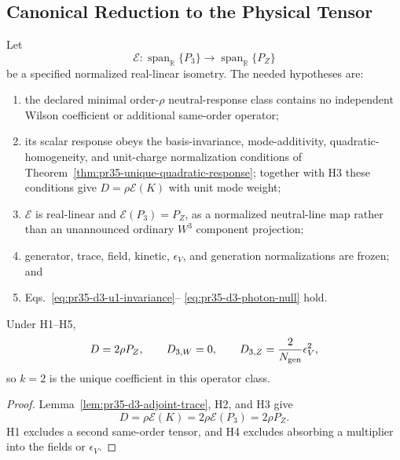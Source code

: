 \subsection{Canonical Reduction to the Physical Tensor}

Let
\begin{equation}
 \mathcal E:\operatorname{span}_{\mathbb R}\{P_3\}
 \longrightarrow\operatorname{span}_{\mathbb R}\{P_Z\}
\end{equation}
be a specified normalized real-linear isometry.  The needed hypotheses are: \begin{enumerate}[label=\textnormal{H\arabic*.},leftmargin=2.8em]  \item the declared minimal order-$\rho$ neutral-response class contains no  independent Wilson coefficient or additional same-order operator;
 \item its scalar response obeys the basis-invariance, mode-additivity,  quadratic-homogeneity, and unit-charge normalization conditions of  Theorem~\ref{thm:pr35-unique-quadratic-response}; together with H3 these  conditions give $D=\rho\mathcal E(K)$ with unit mode weight;  \item $\mathcal E$ is real-linear and $\mathcal E(P_3)=P_Z$, as a normalized  neutral-line map rather than an unannounced ordinary $W^3$ component  projection;
 \item generator, trace, field, kinetic, $\epsilon_V$, and generation
 normalizations are frozen; and
 \item Eqs.~\eqref{eq:pr35-d3-u1-invariance}--
 \eqref{eq:pr35-d3-photon-null} hold.
\end{enumerate}

\begin{theorem}
\label{thm:pr35-d3-conditional-uniqueness}
Under H1--H5,
\begin{equation}
 D=2\rho P_Z,\qquad
 D_{3,W}=0,\qquad
 D_{3,Z}=\frac{2}{N_{\rm gen}}\epsilon_V^2,
 \label{eq:pr35-d3-unique-canonical-result}
\end{equation}
so $k=2$ is the unique coefficient in this operator class.
\end{theorem}

\begin{proof}
Lemma~\ref{lem:pr35-d3-adjoint-trace}, H2, and H3 give
\begin{equation}
 D=\rho\mathcal E(K)=2\rho\mathcal E(P_3)=2\rho P_Z.
\end{equation}
H1 excludes a second same-order tensor, and H4 excludes absorbing a multiplier into the fields or $\epsilon_V$.
\end{proof}

